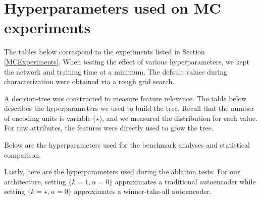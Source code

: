


\newpage
\section{Hyperparameters used on MC experiments}
\par The tables below correspond to the experiments listed in Section
\ref{MCExperiments}. When testing the effect of various hyperparameters, we
kept the network and training time at a minimum. The default values during
characterization were obtained via a rough grid search.



\par A decision-tree was constructed to measure feature relevance.  The table
below describes the hyperparameters we used to build the tree.  Recall that the
number of encoding units is variable ($\star$), and we measured the
distribution for each value. For raw attributes, the features were directly
used to grow the tree.



\par Below are the hyperparameters used for the benchmark analyses and
statistical comparison. 




\par Lastly, here are the hyperparameters used during the ablation tests. For
our architecture, setting $\{k=1, \alpha=0\}$ approximates a traditional
autoencoder while setting $\{k=\star, \alpha=0\}$ approximates a
winner-take-all autoencoder.


